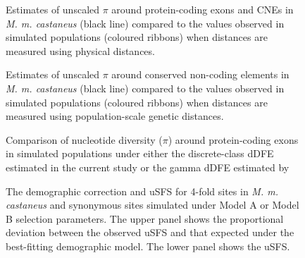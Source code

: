  \begin{figure}[h!]
   \centering      
   \noindent{}
 \caption[Estimates of unscaled $\pi$ around protein-coding exons and CNEs in \textit{M. m. castaneus} compared to the values observed in simulated populations - physical distance]{Estimates of unscaled $\pi$ around protein-coding exons and CNEs in \textit{M. m. castaneus} (black line) compared to the values observed in simulated populations (coloured ribbons) when distances are measured using physical distances.}
 \label{fig:C3S3}
\end{figure}



 \begin{figure}[h!]
   \centering      
   \noindent{}
 \caption[Estimates of unscaled $\pi$ around protein-coding exons and CNEs in \textit{M. m. castaneus} compared to the values observed in simulated populations - genetic distance]{Estimates of unscaled $\pi$ around conserved non-coding elements in \textit{M. m. castaneus} (black line) compared to the values observed in simulated populations (coloured ribbons) when distances are measured using population-scale genetic distances.}
 \label{fig:C3S4}
\end{figure}



 \begin{figure}[h!]
   \centering      
   \noindent{}
 \caption[Comparison of nucleotide diversity ($\pi$) around protein-coding exons in simulated populations assuming a discrete or a continuous model of the dDFE]{Comparison of nucleotide diversity ($\pi$) around protein-coding exons in simulated populations under either the discrete-class dDFE estimated in the current study or the gamma dDFE estimated by \cite{RN122}}
 \label{fig:C3S5}
\end{figure}



 \begin{figure}[h!]
   \centering      
   \noindent{}
 \caption[The demographic correction and uSFS for 4-fold sites in \textit{M. m. castaneus} and synonymous sites simulated under Model A or Model B selection parameters]{The demographic correction and uSFS for 4-fold sites in \textit{M. m. castaneus} and synonymous sites simulated under Model A or Model B selection parameters. The upper panel shows the proportional deviation between the observed uSFS and that expected under the best-fitting demographic model. The lower panel shows the uSFS.}
 \label{fig:C3S6}
\end{figure}



